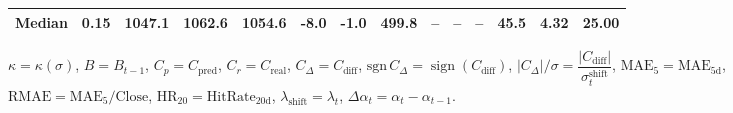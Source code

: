 \begin{threeparttable}
{\begin{tabular}{lrrrrrrrrrrrrr}
 Median &     0.15 & 1047.1 & 1062.6 & 1054.6 &       -8.0 &                     -1.0 &               499.8 &         -- &        -- &             -- &             45.5 &            4.32 &                  25.00 \\
\bottomrule
\end{tabular}
}%
\begin{tablenotes}\footnotesize
\item $\kappa=\kappa(\sigma)$, $B=B_{t-1}$, $C_p=C_{\text{pred}}$, $C_r=C_{\text{real}}$, $C_\Delta=C_{\text{diff}}$, $\mathrm{sgn}\,C_\Delta=\operatorname{sign}(C_{\text{diff}})$, $|C_\Delta|/\sigma=\dfrac{|C_{\text{diff}}|}{\sigma_t^{\text{shift}}}$, $\mathrm{MAE}_5=\mathrm{MAE}_{5\text{d}}$, $\mathrm{RMAE}= \mathrm{MAE}_5 / \text{Close}$, $\mathrm{HR}_{20}=\mathrm{HitRate}_{20\text{d}}$, 
$\lambda_{\text{shift}}=\lambda_t$, 
$\Delta\alpha_t=\alpha_t-\alpha_{t-1}$.
\end{tablenotes}
\end{threeparttable}
\endgroup